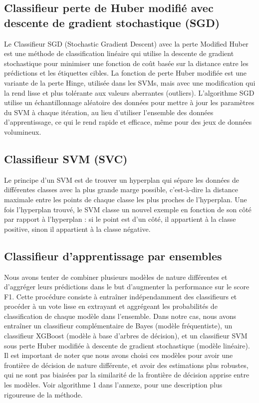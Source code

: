 \documentclass{article}
\begin{document}
\subsection{Classifieur perte de Huber modifié avec descente de gradient stochastique (SGD)}
Le Classifieur SGD (Stochastic Gradient Descent) avec la perte Modified Huber est une méthode de classification linéaire qui utilise la descente de gradient stochastique pour minimiser une fonction de coût basée sur la distance entre les prédictions et les étiquettes cibles. La fonction de perte Huber modifiée est une variante de la perte Hinge, utilisée dans les SVMs, mais avec une modification qui la rend lisse et plus tolérante aux valeurs aberrantes (outliers). L'algorithme SGD utilise un échantillonnage aléatoire des données pour mettre à jour les paramètres du SVM à chaque itération, au lieu d'utiliser l’ensemble des données d'apprentissage, ce qui le rend rapide et efficace, même pour des jeux de données volumineux.

\subsection{Classifieur SVM (SVC)}
Le principe d'un SVM est de trouver un hyperplan qui sépare les données de différentes classes avec la plus grande marge possible, c'est-à-dire la distance maximale entre les points de chaque classe les plus proches de l'hyperplan. Une fois l'hyperplan trouvé, le SVM classe un nouvel exemple en fonction de son côté par rapport à l'hyperplan : si le point est d’un côté, il appartient à la classe positive, sinon il appartient à la classe négative.

\subsection{Classifieur d'apprentissage par ensembles}
Nous avons tenter de combiner plusieurs modèles de nature différentes et d'aggréger leurs prédictions dans le but d'augmenter la performance sur le score F1. Cette procédure consiste à entraîner indépendamment des classifieurs et procéder à un vote lisse en extrayant et aggrégeant les probabilités de classification de chaque modèle dans l'ensemble. Dans notre cas, nous avons entraîner un classifieur complémentaire de Bayes (modèle fréquentiste), un classifieur XGBoost (modèle à base d'arbres de décision), et un classifieur SVM sous perte Huber modifiée à descente de gradient stochastique (modèle linéaire). Il est important de noter que nous avons choisi ces modèles pour avoir une frontière de décision de nature différente, et avoir des estimations plus robustes, qui ne sont pas biaisées par la similarité de la frontière de décision apprise entre les modèles. Voir algorithme 1 dans l'annexe, pour une description plus rigoureuse de la méthode.
\end{document}
